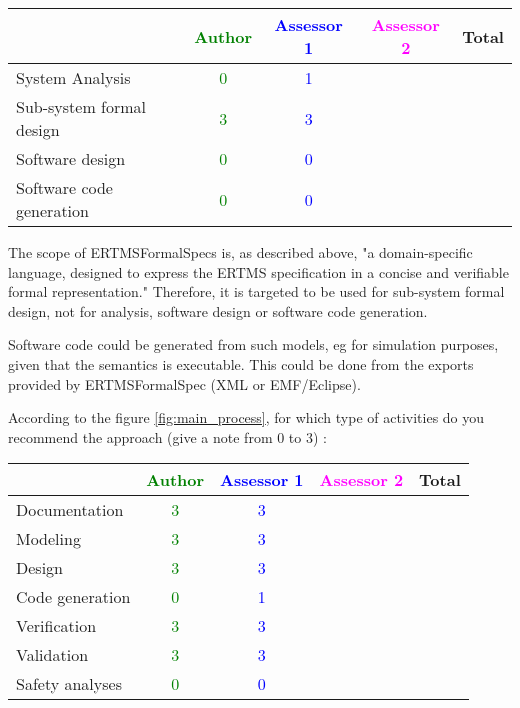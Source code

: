 \begin{tabular}{|l | c | c | c | c|}
\hline
& \textcolor{green}{Author} & \textcolor{blue}{Assessor 1} & \textcolor{magenta}{Assessor 2} & Total \\
\hline 
System Analysis & \textcolor{green}{0} & \textcolor{blue}{1} & &  \\
\hline
Sub-system formal design & \textcolor{green}{3} & \textcolor{blue}{3} & & \\
\hline
Software design & \textcolor{green}{0} & \textcolor{blue}{0} & & \\
\hline
Software code generation & \textcolor{green}{0} & \textcolor{blue}{0} & & \\
\hline
\end{tabular}

\begin{author_comment}
The scope of ERTMSFormalSpecs is, as described above, "a domain-specific language, designed to express the ERTMS specification in a concise and verifiable formal representation."
Therefore, it is targeted to be used for sub-system formal design, not for analysis, software design or software code generation.
\end{author_comment}

\begin{assessor1}
Software code could be generated from such models, eg for simulation purposes, given that the semantics is executable. This could be done from the exports provided by ERTMSFormalSpec (XML or EMF/Eclipse). 
\end{assessor1}

According to the figure \ref{fig:main_process}, for which type of activities do you recommend the approach (give a note from 0 to  3) :

\begin{tabular}{|l | c | c | c | c|}
\hline
& \textcolor{green}{Author} & \textcolor{blue}{Assessor 1} & \textcolor{magenta}{Assessor 2} & Total \\
\hline 
Documentation & \textcolor{green}{3} & \textcolor{blue}{3} & &  \\
\hline
Modeling & \textcolor{green}{3} & \textcolor{blue}{3} & &  \\
\hline
Design & \textcolor{green}{3} & \textcolor{blue}{3} & & \\
\hline
Code generation & \textcolor{green}{0} & \textcolor{blue}{1} & & \\
\hline
Verification & \textcolor{green}{3} & \textcolor{blue}{3} & & \\
\hline
Validation & \textcolor{green}{3} & \textcolor{blue}{3} & & \\
\hline
Safety analyses & \textcolor{green}{0} & \textcolor{blue}{0} & & \\
\hline
\end{tabular}

